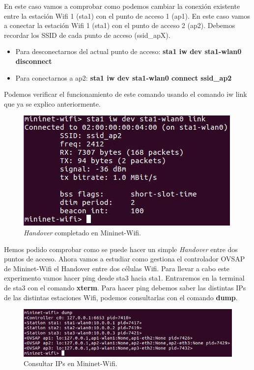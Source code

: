 \newline
En este caso vamos a comprobar como podemos cambiar la conexión existente entre la estación Wifi 1 (sta1) con el punto de acceso 1 (ap1). En este caso vamos a conectar la estación Wifi 1 (sta1) con el punto de acceso 2 (ap2). Debemos recordar los SSID de cada punto de acceso (ssid\_apX).\newline
\newline
\begin{center}
\begin{itemize}
    \item  Para desconectarnos del actual punto de acceso:  \textbf{sta1 iw dev sta1-wlan0 disconnect}
    \item Para conectarnos a ap2: \textbf{sta1 iw dev sta1-wlan0 connect ssid\_ap2}
\end{itemize}
\end{center}
Podemos verificar el funcionamiento de este comando usando el comando iw link que ya se explico anteriormente.
\begin{figure}[!htb]
  \centering
    \includegraphics[width=0.5\linewidth]{./img/12.JPG}
    \caption{\textit{Handover} completado en Mininet-Wifi.}
  \label{fig:yo}
\end{figure}
Hemos podido comprobar como se puede hacer un simple \textit{Handover} entre dos puntos de acceso.
\newpage
Ahora vamos a estudiar como gestiona el controlador OVSAP de Mininet-Wifi el Handover entre dos células Wifi. Para llevar a cabo este experimento vamos hacer ping desde sta3 hacia sta1. Entraremos en la terminal de sta3 con el comando \textbf{xterm}. Para hacer ping debemos saber las distintas IPs de las distintas estaciones Wifi, podemos consultarlas con el comando \textbf{dump}.
\begin{figure}[!htb]
  \centering
    \includegraphics[width=\linewidth]{./img/13.JPG}
    \caption{Consultar IPs en Mininet-Wifi.}
  \label{fig:yo}
\end{figure}
